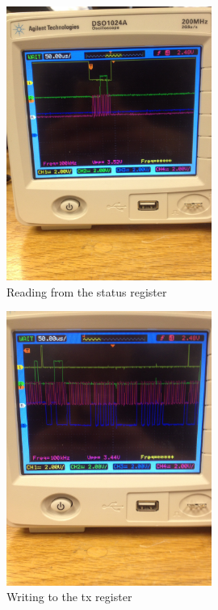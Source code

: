 \documentclass{article}
\begin{document}
\begin{figure}[H]
    \centering
    \includegraphics[width=0.6\textwidth,angle=-90]{status_read.jpg}
    \caption{Reading from the status register}
\end{figure}

\begin{figure}[H]
    \centering
    \includegraphics[width=0.6\textwidth,angle=-90]{tx_addr_write.jpg}
    \caption{Writing to the tx register}
\end{figure}
\end{document}
